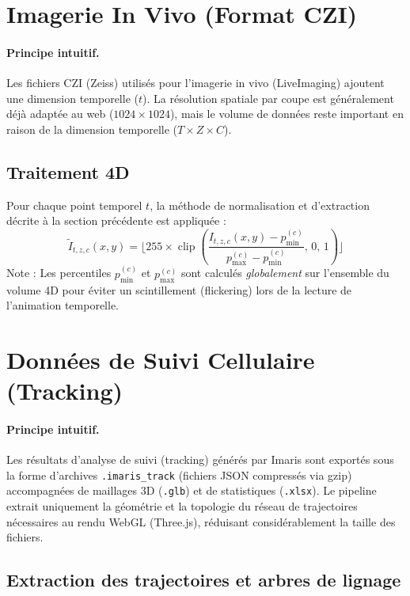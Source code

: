\documentclass[11pt,a4paper]{article}
\begin{document}
\section{Imagerie In Vivo (Format CZI)}

\paragraph{Principe intuitif.}
Les fichiers CZI (Zeiss) utilisés pour l'imagerie in vivo (LiveImaging) ajoutent une dimension temporelle ($t$). La résolution spatiale par coupe est généralement déjà adaptée au web ($1024 \times 1024$), mais le volume de données reste important en raison de la dimension temporelle ($T \times Z \times C$).

\subsection{Traitement 4D}

Pour chaque point temporel $t$, la méthode de normalisation et d'extraction décrite à la section précédente est appliquée :
\[
\tilde{I}_{t,z,c}(x,y) = \lfloor 255 \times \operatorname{clip}\left( \frac{I_{t,z,c}(x,y) - p_{\min}^{(c)}}{p_{\max}^{(c)} - p_{\min}^{(c)}}, \, 0, \, 1 \right) \rfloor
\]
Note : Les percentiles $p_{\min}^{(c)}$ et $p_{\max}^{(c)}$ sont calculés \emph{globalement} sur l'ensemble du volume 4D pour éviter un scintillement (flickering) lors de la lecture de l'animation temporelle.

\section{Données de Suivi Cellulaire (Tracking)}

\paragraph{Principe intuitif.}
Les résultats d'analyse de suivi (tracking) générés par Imaris sont exportés sous la forme d'archives \texttt{.imaris\_track} (fichiers JSON compressés via gzip) accompagnées de maillages 3D (\texttt{.glb}) et de statistiques (\texttt{.xlsx}). Le pipeline extrait uniquement la géométrie et la topologie du réseau de trajectoires nécessaires au rendu WebGL (Three.js), réduisant considérablement la taille des fichiers.

\subsection{Extraction des trajectoires et arbres de lignage}
\end{document}
